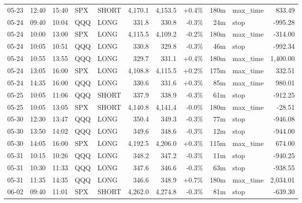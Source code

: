 \documentclass[11pt,a4paper,twoside]{article}
\begin{document}
\begin{center}
\begin{longtable}{>{\color{txtmain}}l l l l l r r r r >{\color{txtmain}}l r}
05-23 & 12:40 & 15:40 & SPX & SHORT & 4,170.1 & 4,153.5 & \textcolor{wingreen}{+0.4\%} & 180m & max\_time & \textcolor{wingreen}{833.49} \\
05-24 & 09:40 & 10:04 & QQQ & LONG & 331.8 & 330.8 & \textcolor{lossred}{-0.3\%} & 24m & stop & \textcolor{lossred}{-995.28} \\
05-24 & 10:00 & 13:00 & SPX & LONG & 4,115.5 & 4,109.2 & \textcolor{lossred}{-0.2\%} & 180m & max\_time & \textcolor{lossred}{-314.00} \\
05-24 & 10:05 & 10:51 & QQQ & LONG & 330.8 & 329.8 & \textcolor{lossred}{-0.3\%} & 46m & stop & \textcolor{lossred}{-992.34} \\
05-24 & 10:55 & 13:55 & QQQ & LONG & 329.7 & 331.1 & \textcolor{wingreen}{+0.4\%} & 180m & max\_time & \textcolor{wingreen}{1,400.00} \\
05-24 & 13:05 & 16:00 & SPX & LONG & 4,108.8 & 4,115.5 & \textcolor{wingreen}{+0.2\%} & 175m & max\_time & \textcolor{wingreen}{332.51} \\
05-24 & 14:35 & 16:00 & QQQ & LONG & 330.6 & 331.6 & \textcolor{wingreen}{+0.3\%} & 85m & max\_time & \textcolor{wingreen}{980.01} \\
05-25 & 10:05 & 11:06 & QQQ & SHORT & 337.9 & 338.9 & \textcolor{lossred}{-0.3\%} & 61m & stop & \textcolor{lossred}{-912.25} \\
05-25 & 10:05 & 13:05 & SPX & SHORT & 4,140.8 & 4,141.4 & \textcolor{lossred}{-0.0\%} & 180m & max\_time & \textcolor{lossred}{-28.51} \\
05-30 & 12:30 & 13:47 & QQQ & LONG & 350.4 & 349.3 & \textcolor{lossred}{-0.3\%} & 77m & stop & \textcolor{lossred}{-946.08} \\
05-30 & 13:50 & 14:02 & QQQ & LONG & 349.6 & 348.6 & \textcolor{lossred}{-0.3\%} & 12m & stop & \textcolor{lossred}{-944.00} \\
05-30 & 14:05 & 16:00 & SPX & LONG & 4,192.5 & 4,206.0 & \textcolor{wingreen}{+0.3\%} & 115m & max\_time & \textcolor{wingreen}{674.00} \\
05-31 & 10:15 & 10:26 & QQQ & LONG & 348.2 & 347.2 & \textcolor{lossred}{-0.3\%} & 11m & stop & \textcolor{lossred}{-940.25} \\
05-31 & 10:30 & 11:33 & QQQ & LONG & 347.6 & 346.6 & \textcolor{lossred}{-0.3\%} & 63m & stop & \textcolor{lossred}{-938.55} \\
05-31 & 11:35 & 14:35 & QQQ & LONG & 346.6 & 348.9 & \textcolor{wingreen}{+0.7\%} & 180m & max\_time & \textcolor{wingreen}{2,034.01} \\
06-02 & 09:40 & 11:01 & SPX & SHORT & 4,262.0 & 4,274.8 & \textcolor{lossred}{-0.3\%} & 81m & stop & \textcolor{lossred}{-639.30} \\

\end{longtable}
\end{center}
\end{document}
